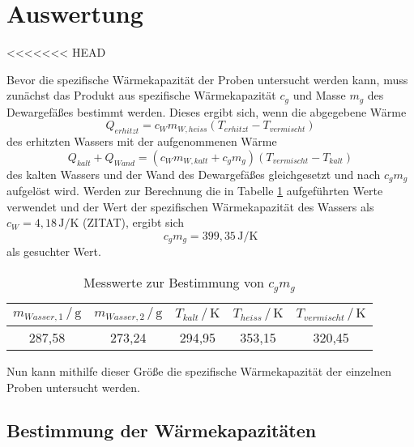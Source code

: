 \section{Auswertung}
\label{sec:Auswertung}
<<<<<<< HEAD

Bevor die spezifische Wärmekapazität der Proben untersucht werden kann, muss zunächst das Produkt 
aus spezifische Wärmekapazität $c_g$ und Masse $m_g$ des Dewargefäßes bestimmt werden. 
Dieses ergibt sich, wenn die abgegebene Wärme 
\begin{equation}
    Q_{erhitzt} = c_{W} m_{W,heiss} (T_{erhitzt}-T_{vermischt})
\end{equation}
des erhitzten Wassers mit der aufgenommenen Wärme 
\begin{equation}
    Q_{kalt} + Q_{Wand} = (c_{W}  m_{W,kalt} + c_g m_g) (T_{vermischt} - T_{kalt})
\end{equation}
des kalten Wassers und der Wand des Dewargefäßes gleichgesetzt und nach $c_g m_g$ aufgelöst wird.
Werden zur Berechnung die in Tabelle \ref{tab:1} aufgeführten Werte verwendet und der Wert 
der spezifischen Wärmekapazität des Wassers als $c_{W} = 4,18\, \si{\joule\per\kelvin} $ (ZITAT),
ergibt sich 
\begin{equation}
    c_g m_g = 399,35\, \si{\joule\per\kelvin}
\end{equation}
\noindent als gesuchter Wert.

\begin{table}[h]
\normalsize

\centering
{}
\begin{tabular}{c c c c c}
\toprule
        $m_{Wasser,1} \,/\, \si{\gram}$ &$ m_{Wasser,2} \,/\, \si{\gram}$ & $T_{kalt} \,/\, \si{\kelvin} $& $T_{heiss} \,/\, \si{\kelvin} $& $T_{vermischt} \,/\, \si{\kelvin} $\\
        \midrule
        287,58 & 273,24‬ & 294,95 & 353,15 & 320,45 \\

\bottomrule

\end{tabular}

\caption{Messwerte zur Bestimmung von $c_g m_g$}
\label{tab:1}
\end{table}
\noindent
Nun kann mithilfe dieser Größe die spezifische Wärmekapazität der einzelnen Proben untersucht werden.





\subsection{Bestimmung der Wärmekapazitäten}

